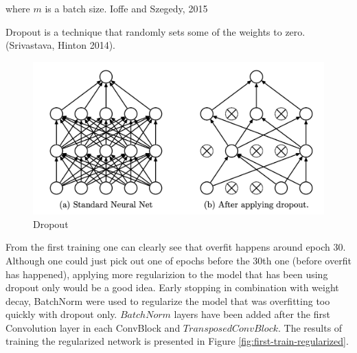 where $m$ is a batch size. Ioffe and Szegedy, 2015

Dropout is a technique that randomly sets some of the weights to zero. (Srivastava, Hinton 2014).
\begin{figure}[htb]
	\begin{center}
		\includegraphics[width=0.8\linewidth]{bilder/dropout.png}
		\caption{Dropout}\label{fig:dropout}
	\end{center}
\end{figure}

From the first training one can clearly see that overfit happens around epoch 30. Although one could just pick out one of epochs before the 30th one (before overfit has happened), applying more regularizion to the model that has been using dropout only would be a good idea. Early stopping in combination with weight decay, BatchNorm were used to regularize the model that was overfitting too quickly with dropout only. $BatchNorm$ layers have been added after the first Convolution layer in each ConvBlock and $TransposedConvBlock$. The results of training the regularized network is presented in Figure \ref{fig:first-train-regularized}.

